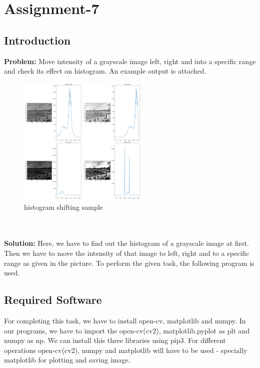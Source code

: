 \documentclass{article}
\begin{document}
{
    \section{Assignment-7}
    \subsection{Introduction}
    \textbf {Problem: }
    Move intensity of a grayscale image left, right and into a specific range and check its effect on histogram. An example output is attached.
    \begin{figure}[htp]
        \centering
        \includegraphics[width=0.55\textwidth]{Assignment-7/PaddyField_Histogram.png}
        \caption{histogram shifting sample}
    \end{figure}
    \\
    \\
    \textbf{Solution: }
    Here, we have to find out the histogram of a grayscale image  at first. Then we have to move the intensity of that image to left, right and to a specific range as given in the picture. To perform the given task, the following program is used.
    \\
    
    \subsection{Required Software}
    For completing this task, we have to install open-cv, matplotlib and numpy. In our programs, we have to import the open-cv(cv2), matplotlib.pyplot as plt and numpy as np. We can install this three libraries using pip3. For different operations open-cv(cv2), numpy and matplotlib will have to be used - specially matplotlib for plotting and saving image. 
    \\
    
}
\end{document}

